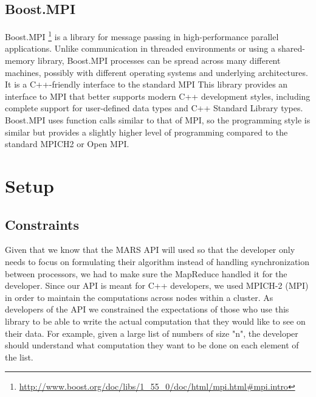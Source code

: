 \documentclass[11pt]{article}
\begin{document}
\subsection{Boost.MPI}
Boost.MPI \footnote{\url{http://www.boost.org/doc/libs/1_55_0/doc/html/mpi.html\#mpi.intro}} is a library for message passing in high-performance parallel applications. Unlike communication in threaded environments or using a shared-memory library, Boost.MPI processes can be spread across many different machines, possibly with different operating systems and underlying architectures. It is a C++-friendly interface to the standard MPI This library provides an interface to MPI that better supports modern C++ development styles, including complete support for user-defined data types and C++ Standard Library types. Boost.MPI uses function calls similar to that of MPI, so the programming style is similar but provides a slightly higher level of programming compared to the standard MPICH2 or Open MPI.

\section{Setup}
\subsection{Constraints}
Given that we know that the MARS API will used so that the developer only needs to focus on formulating their algorithm instead of handling synchronization between processors, we had to make sure the MapReduce handled it for the developer. Since our API is meant for C++ developers, we used MPICH-2 (MPI) in order to maintain the computations across nodes within a cluster. As developers of the API we constrained the expectations of those who use this library to be able to write the actual computation that they would like to see on their data. For example, given a large list of numbers of size "n", the developer should understand what computation they want to be done on each element of the list. 
\end{document}
